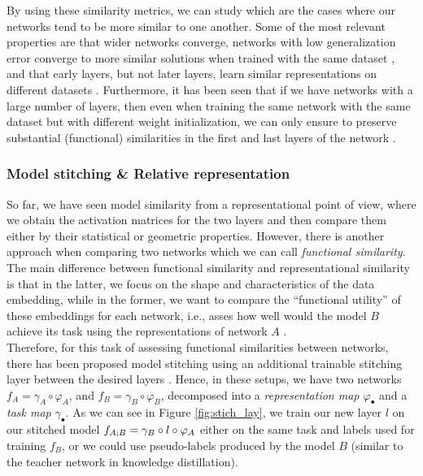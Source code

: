 \documentclass[../main.tex]{subfiles}
\begin{document}
By using these similarity metrics, we can study which are the cases where our networks tend to be more similar to one another. Some of the most relevant properties are that wider networks converge, networks with low generalization error converge to more similar solutions when trained with the same dataset \cite{morcos_insights_2018}, and that early layers, but not later layers, learn similar representations on different datasets \cite{barannikov_representation_2022}. Furthermore, it has been seen that if we have networks with a large number of layers, then even when training the same network with the same dataset but with different weight initialization, we can only ensure to preserve substantial (functional) similarities in the first and last layers of the network \cite{wang_towards_2018}.


\subsubsection*{Model stitching \& Relative representation}
So far, we have seen model similarity from a representational point of view, where we obtain the activation matrices for the two layers and then compare them either by their statistical or geometric properties. However, there is another approach when comparing two networks which we can call \emph{functional similarity}. The main difference between functional similarity and representational similarity is that in the latter, we focus on the shape and characteristics of the data embedding, while in the former, we want to compare the ``functional utility'' of these embeddings for each network, i.e., asses how well would the model $B$ achieve its task using the representations of network $A$ \cite{csiszarik_similarity_2021}.\\

Therefore, for this task of assessing functional similarities between networks, there has been proposed model stitching using an additional trainable stitching layer between the desired layers \cite{csiszarik_similarity_2021, bansal_revisiting_2021, li_convergent_2016}. Hence, in these setups, we have two networks $f_A=\gamma_A \circ \varphi_A$, and $f_B=\gamma_B \circ \varphi_B$, decomposed into a \emph{representation map $\varphi_\bullet$} and a \emph{task map $\gamma_\bullet$}. As we can see in Figure \ref{fig:stich_lay}, we train our new layer $l$ on our stitched model $f_{A \mathbin{;} B}=\gamma_B \circ l \circ \varphi_A$ either on the same task and labels used for training $f_B$, or we could use pseudo-labels produced by the model $B$ (similar to the teacher network in knowledge distillation). 
\end{document}
